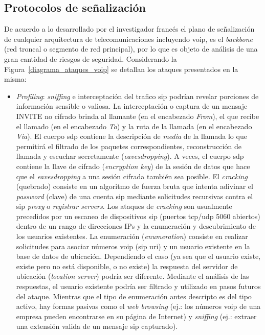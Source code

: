 \documentclass[a4paper,12pt]{report}
\begin{document}
\subsection{Protocolos de señalización} 

De acuerdo a lo desarrollado por el investigador francés \cite{nassarm} el plano
de señalización de cualquier arquitectura de telecomunicaciones incluyendo \ac{voip},
es el \emph{backbone} (red troncal o segmento de red principal), por
lo que es objeto de análisis de una gran cantidad de riesgos de seguridad. Considerando la 
Figura~\ref{diagrama_ataques_voip} se detallan los ataques presentados en la misma:
\begin{itemize}
\item \emph{Profiling}:
\emph{sniffing} e interceptación del trafico \ac{sip} podrían revelar porciones de
información sensible o valiosa. La interceptación o captura de un mensaje
INVITE no cifrado brinda al llamante (en el encabezado \emph{From}), el
que recibe el llamado (en el encabezado \emph{To}) y la ruta de la
llamada (en el encabezado \emph{Via}). El cuerpo \ac{sdp} contiene la
descripción de \emph{media} de la llamada lo que permitirá el filtrado de los
paquetes correspondientes, reconstrucción de llamada y escuchar secretamente
(\emph{eavesdropping}). 
A veces, el cuerpo \ac{sdp} contiene la llave de cifrado (\emph{encryption key}) de
la sesión de datos que hace que el \emph{eavesdropping} a una sesión cifrada
también sea posible. 
El \emph{cracking} (quebrado) consiste en un algoritmo de fuerza bruta
que intenta adivinar el \emph{password} (clave) de una cuenta \ac{sip} mediante
solicitudes recursivas contra el \ac{sip} \emph{proxy} o \emph{registrar servers}.
Los ataques de \emph{cracking} son usualmente precedidos por un escaneo de
dispositivos \ac{sip} (puertos \ac{tcp}/\ac{udp} 5060 abiertos) dentro de un rango de
direcciones IPs y la enumeración y descubrimiento de los usuarios existentes.
La enumeración (\emph{enumeration}) consiste en realizar solicitudes para
asociar números \ac{voip} (\ac{sip} \ac{uri}) y un usuario existente en la base de datos de
ubicación. Dependiendo el caso (ya sea que el usuario existe, existe pero no
está disponible, o no existe) la respuesta del servidor de ubicación
(\emph{location server}) podría ser diferente. Mediante el análisis de las
respuestas, el usuario existente podría ser filtrado y utilizado en pasos
futuros del ataque. Mientras que el tipo de enumeración antes descripto es del
tipo activo, hay formas pasivas como el \emph{web browsing} (ej.: los números
\ac{voip} de una empresa pueden encontrarse en su página de Internet) y \emph{sniffing}
(ej.: extraer una extensión valida de un mensaje \ac{sip} capturado).
 

\end{itemize}
\end{document}
